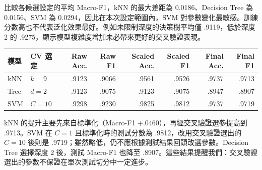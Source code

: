 比較各候選設定的平均 Macro-F1，kNN 的最大差距為 0.0186、Decision Tree 為 0.0156、SVM 為 0.0294，因此在本次設定範圍內，SVM 對參數變化最敏感。訓練分數高也不代表泛化效果最好。例如未限制深度的決策樹平均僅 .9119，低於深度 2 的 .9275，顯示模型複雜度增加未必帶來更好的交叉驗證表現。

\begin{center}
\compacttable
\begin{tabular}{llrrrrrr}
\toprule
模型 & CV 選定 & Raw Acc. & Raw F1 & Scaled Acc. & Scaled F1 & Final Acc. & Final F1 \\
\midrule
kNN & $k=9$ & .9123 & .9066 & .9561 & .9526 & .9737 & .9713 \\
Tree & $d=2$ & .9123 & .9075 & .9123 & .9075 & .8947 & .8907 \\
SVM & $C=10$ & .9298 & .9230 & .9825 & .9812 & .9737 & .9719 \\
\bottomrule
\end{tabular}
\end{center}
kNN 的提升主要先來自標準化（Macro-F1 +.0460），再經交叉驗證選參提高到 .9713。SVM 在 $C=1$ 且標準化時的測試分數為 .9812，改用交叉驗證選出的 $C=10$ 後則是 .9719；雖然略低，仍不應根據測試結果回頭改選參數。Decision Tree 選擇深度 2 後，測試 Macro-F1 也降至 .8907。這些結果提醒我們：交叉驗證選出的參數不保證在單次測試切分中一定進步。
